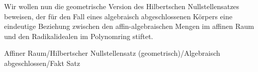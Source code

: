 \setcounter{section}{11}







Wir wollen nun die geometrische Version des Hilbertschen Nullstellensatzes beweisen, der für den Fall eines algebraisch abgeschlossenen Körpers eine eindeutige Beziehung zwischen den affin-algebraischen Mengen im affinen Raum
 und den Radikalidealen im Polynomring stiftet.





{Affiner Raum/Hilbertscher Nullstellensatz (geometrisch)/Algebraisch abgeschlossen/Fakt}
{Satz}
{}
{



\faktsituation {}
\faktzusatz {}
\faktzusatz {}





}
